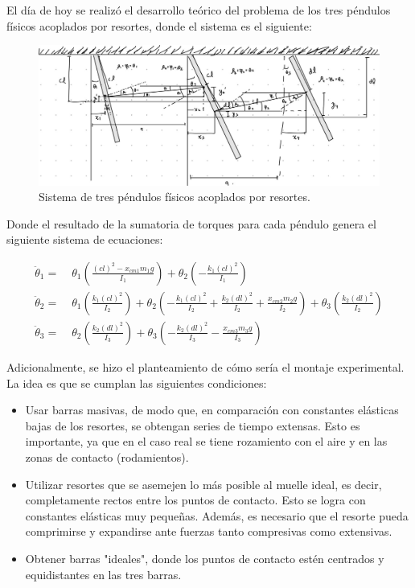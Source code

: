 El día de hoy se realizó el desarrollo teórico del problema de los tres péndulos físicos acoplados por resortes, donde el sistema es el siguiente:

\begin{figure}[htbp!]
  \centering
  \includegraphics[width=0.8\linewidth]{Figures/IM1.jpeg}
  \caption{Sistema de tres péndulos físicos acoplados por resortes.}
  \label{fig:sistema_pendulos}
\end{figure}

Donde el resultado de la sumatoria de torques para cada péndulo genera el siguiente sistema de ecuaciones:

\begin{equation}
  \begin{aligned}
    \ddot{\theta}_1 =\; & \theta_1 \left( \frac{(cl)^2 - x_{cm1} m_1 g}{I_1} \right) + \theta_2 \left( -\frac{k_1 (cl)^2}{I_1} \right) \\
    \ddot{\theta}_2 =\; & \theta_1 \left( \frac{k_1 (cl)^2}{I_2} \right) + \theta_2 \left( -\frac{k_1 (cl)^2}{I_2} + \frac{k_2 (dl)^2}{I_2} + \frac{x_{cm2} m_2 g}{I_2} \right) + \theta_3 \left( \frac{k_2 (dl)^2}{I_2} \right) \\
    \ddot{\theta}_3 =\; & \theta_2 \left( \frac{k_2 (dl)^2}{I_3} \right) + \theta_3 \left( -\frac{k_2 (dl)^2}{I_3} - \frac{x_{cm3} m_3 g}{I_3} \right)
  \end{aligned}
\end{equation}

\vspace{ 0.5cm }


Adicionalmente, se hizo el planteamiento de cómo sería el montaje experimental. La idea es que se cumplan las siguientes condiciones:

\begin{itemize}
  \item Usar barras masivas, de modo que, en comparación con constantes elásticas bajas de los resortes, se obtengan series de tiempo extensas. Esto es importante, ya que en el caso real se tiene rozamiento con el aire y en las zonas de contacto (rodamientos).
  
  \item Utilizar resortes que se asemejen lo más posible al muelle ideal, es decir, completamente rectos entre los puntos de contacto. Esto se logra con constantes elásticas muy pequeñas. Además, es necesario que el resorte pueda comprimirse y expandirse ante fuerzas tanto compresivas como extensivas.
  
  \item Obtener barras "ideales", donde los puntos de contacto estén centrados y equidistantes en las tres barras.
\end{itemize}

